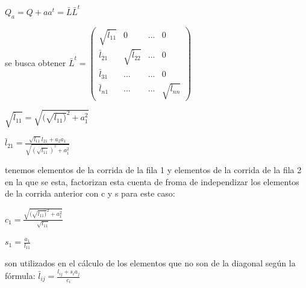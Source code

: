 \documentclass{endm}
\begin{document}
$Q_{a}=Q + aa^{t} = \bar{L}\bar{L}^{t}$

se busca obtener $\bar{L}^{t}=\begin{pmatrix}
\sqrt{ \bar{l}_{11}}          &0     &...  &0 \\ 
\bar{l}_{21}       &\sqrt{ \bar{l}_{22}}       &...       &0 \\ 
\bar{l}_{31}                   &...       &...       &0 \\

\bar{l}_{n1}                   &...       &...       &\sqrt{ \bar{l}_{nn}}
\end{pmatrix}$


$\sqrt{ \bar{l}_{11}} =\sqrt{ (\sqrt{{l}_{11})}^{2} +a_{1}^{2}}$


$\bar{l}_{21} =  \frac{\sqrt{{l}_{11}}{l}_{21} +a_{2}a_{1}}{\sqrt{(\sqrt{{l}_{11}})^{^{2}}+a_{1}^{2}}}$


tenemos elementos de la corrida de la fila 1 y elementos de la corrida de la fila 2 en la que se esta, factorizan esta cuenta de froma de independizar los elementos de la corrida anterior con c y s 
para este caso:

$c_{1}=\frac{\sqrt{ (\sqrt{{l}_{11})}^{2} +a_{1}^{2}}}{\sqrt{{l}_{11}}}$


$s_{1}=\frac{a_{1}}{{l}_{11}}$


son utilizados en el cálculo de los elementos que no son de la diagonal
según la fórmula: $\bar{l}_{ij} =  \frac{{{l}_{ij}} +{s}_{i}a_{j}}{c_{i}}$

\end{document}
